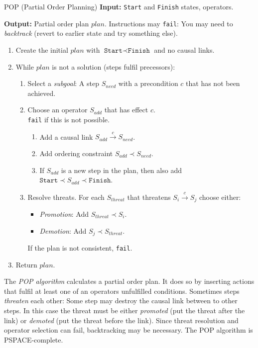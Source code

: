 \documentclass[english]{panikzettel}
\begin{document}
\begin{algo}{POP (Partial Order Planning)}
\textbf{Input:} \texttt{Start} and \texttt{Finish} states, operators.

\textbf{Output:} Partial order plan $plan$.
\tcblower
{\small Instructions may \texttt{fail}: You may need to \emph{backtrack} (revert to earlier state and try something else).}
\smallskip

\begin{enumerate}
    \item Create the initial $plan$ with $\texttt{Start} \prec \texttt{Finish}$ and no causal links.
    \item While $plan$ is not a solution (steps fulfil precessors):
        \begin{enumerate}
            \item Select a \emph{subgoal}: A step $S_{need}$ with a precondition $c$ that has not been achieved.
            \item Choose an operator $S_{add}$ that has effect $c$. \\
                  \texttt{fail} if this is not possible.
                \begin{enumerate}
                    \item Add a causal link $S_{add} \stackrel{c}{\to} S_{need}$.
                    \item Add ordering constraint $S_{add} \prec S_{need}$.
                    \item If $S_{add}$ is a new step in the plan, then also add $\texttt{Start} \prec S_{add} \prec \texttt{Finish}$.
                \end{enumerate}
            \item Resolve threats. For each $S_{threat}$ that threatens $S_i \stackrel{c}{\to} S_j$ choose either:
                \begin{itemize}[leftmargin=2em]
                    \item \emph{Promotion}: Add $S_{threat} \prec S_i$.
                    \item \emph{Demotion}: Add $S_j \prec S_{threat}$.
                \end{itemize}
                If the plan is not consistent, \texttt{fail}.
        \end{enumerate}
    \item Return $plan$.
\end{enumerate}
\end{algo}

The \emph{POP algorithm} calculates a partial order plan.
It does so by inserting actions that fulfil at least one of an operators unfulfilled conditions.
Sometimes steps \emph{threaten} each other: Some step may destroy the causal link between to other steps.
In this case the threat must be either \emph{promoted} (put the threat after the link) or \emph{demoted} (put the threat before the link).
Since threat resolution and operator selection can fail, backtracking may be necessary.
The POP algorithm is PSPACE-complete.
\end{document}
